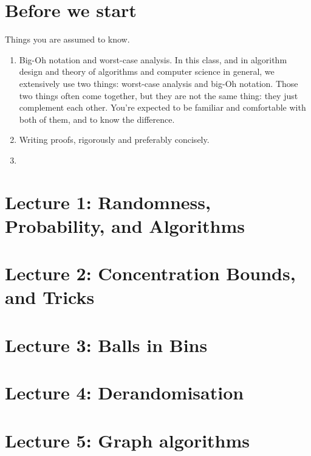 \documentclass[a4paper]{tufte-book}
\begin{document}
\tableofcontents

\listoffigures

\listoftables
\mainmatter

\chapter*{Before we start}
Things you are assumed to know.
\begin{enumerate}
    \item Big-Oh notation and worst-case analysis. In this class, and in algorithm design and theory of algorithms and computer science in general,
we extensively use two things: worst-case analysis and big-Oh notation. Those two things often come together, but they are not the same thing: they just
complement each other. You're expected to be familiar and comfortable with both of them, and to know the difference.
    \item Writing proofs, rigorously and preferably concisely.
    \item \TODO
\end{enumerate}

\chapter{Lecture 1: Randomness, Probability, and Algorithms}


\chapter{Lecture 2: Concentration Bounds, and Tricks}\label{chap:2}


\chapter{Lecture 3: Balls in Bins}


\chapter{Lecture 4: Derandomisation}


\chapter{Lecture 5: Graph algorithms}




\end{document}
